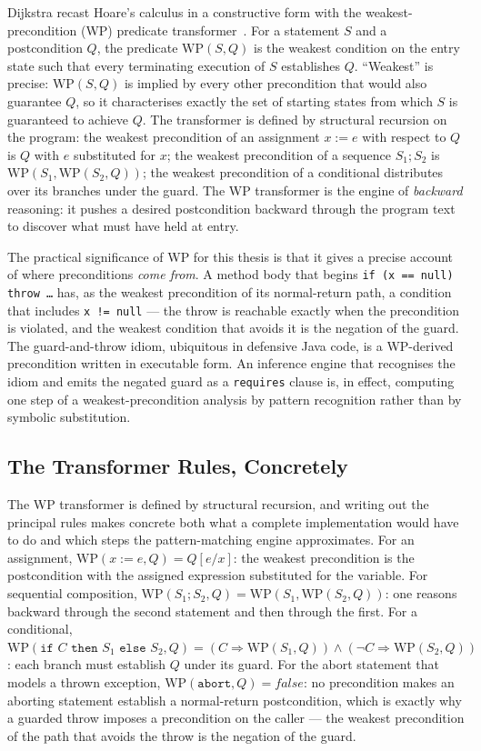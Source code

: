 Dijkstra recast Hoare's calculus in a constructive form with the
weakest-precondition (WP) predicate transformer~\cite{dijkstra_guarded_1975,
dijkstra1976discipline}. For a statement $S$ and a postcondition $Q$, the
predicate $\mathrm{WP}(S, Q)$ is the weakest condition on the entry state such
that every terminating execution of $S$ establishes $Q$. ``Weakest'' is
precise: $\mathrm{WP}(S, Q)$ is implied by every other precondition that would
also guarantee $Q$, so it characterises exactly the set of starting states
from which $S$ is guaranteed to achieve $Q$. The transformer is defined by
structural recursion on the program: the weakest precondition of an
assignment $x := e$ with respect to $Q$ is $Q$ with $e$ substituted for $x$;
the weakest precondition of a sequence $S_1; S_2$ is
$\mathrm{WP}(S_1, \mathrm{WP}(S_2, Q))$; the weakest precondition of a
conditional distributes over its branches under the guard. The WP transformer
is the engine of \emph{backward} reasoning: it pushes a desired postcondition
backward through the program text to discover what must have held at entry.

The practical significance of WP for this thesis is that it gives a precise
account of where preconditions \emph{come from}. A method body that begins
\texttt{if (x == null) throw \dots} has, as the weakest precondition of its
normal-return path, a condition that includes \texttt{x != null} --- the
throw is reachable exactly when the precondition is violated, and the weakest
condition that avoids it is the negation of the guard. The guard-and-throw
idiom, ubiquitous in defensive Java code, is a WP-derived precondition written
in executable form. An inference engine that recognises the idiom and emits
the negated guard as a \texttt{requires} clause is, in effect, computing one
step of a weakest-precondition analysis by pattern recognition rather than by
symbolic substitution.

\subsection{The Transformer Rules, Concretely}

The WP transformer is defined by structural recursion, and writing out the
principal rules makes concrete both what a complete implementation would have to
do and which steps the pattern-matching engine approximates. For an assignment,
$\mathrm{WP}(x := e, Q) = Q[e/x]$: the weakest precondition is the postcondition
with the assigned expression substituted for the variable. For sequential
composition, $\mathrm{WP}(S_1; S_2, Q) = \mathrm{WP}(S_1, \mathrm{WP}(S_2, Q))$:
one reasons backward through the second statement and then through the first.
For a conditional,
$\mathrm{WP}(\texttt{if } C \texttt{ then } S_1 \texttt{ else } S_2, Q) =
(C \Rightarrow \mathrm{WP}(S_1, Q)) \wedge (\neg C \Rightarrow \mathrm{WP}(S_2, Q))$:
each branch must establish $Q$ under its guard. For the abort statement that
models a thrown exception, $\mathrm{WP}(\texttt{abort}, Q) = \mathit{false}$: no
precondition makes an aborting statement establish a normal-return postcondition,
which is exactly why a guarded throw imposes a precondition on the caller --- the
weakest precondition of the path that avoids the throw is the negation of the
guard.

